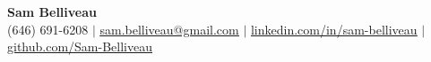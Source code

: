 \begin{center}
    \textbf{\Huge Sam Belliveau} \\ \vspace{1pt}
    \small (646) 691-6208 $|$ 
    \href{mailto:sam.belliveau@gmail.com}{\underline{sam.belliveau@gmail.com}} $|$ 
    \href{https://linkedin.com/in/sam-belliveau}{\underline{linkedin.com/in/sam-belliveau}} $|$
    \href{https://github.com/Sam-Belliveau}{\underline{github.com/Sam-Belliveau}}
\end{center}